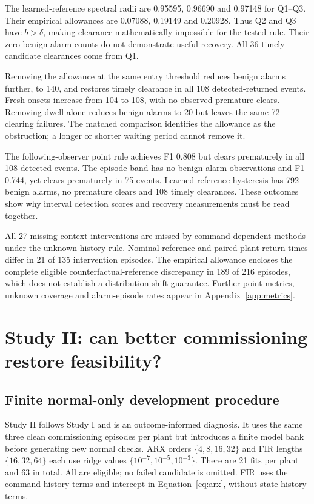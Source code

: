 \documentclass[11pt]{article}
\begin{document}
The learned-reference spectral radii are 0.95595, 0.96690 and 0.97148 for Q1--Q3. Their empirical allowances are 0.07088, 0.19149 and 0.20928. Thus Q2 and Q3 have $b>\delta$, making clearance mathematically impossible for the tested rule. Their zero benign alarm counts do not demonstrate useful recovery. All 36 timely candidate clearances come from Q1.

Removing the allowance at the same entry threshold reduces benign alarms further, to 140, and restores timely clearance in all 108 detected-returned events. Fresh onsets increase from 104 to 108, with no observed premature clears. Removing dwell alone reduces benign alarms to 20 but leaves the same 72 clearing failures. The matched comparison identifies the allowance as the obstruction; a longer or shorter waiting period cannot remove it.

The following-observer point rule achieves F1 0.808 but clears prematurely in all 108 detected events. The episode band has no benign alarm observations and F1 0.744, yet clears prematurely in 75 events. Learned-reference hysteresis has 792 benign alarms, no premature clears and 108 timely clearances. These outcomes show why interval detection scores and recovery measurements must be read together.

All 27 missing-context interventions are missed by command-dependent methods under the unknown-history rule. Nominal-reference and paired-plant return times differ in 21 of 135 intervention episodes. The empirical allowance encloses the complete eligible counterfactual-reference discrepancy in 189 of 216 episodes, which does not establish a distribution-shift guarantee. Further point metrics, unknown coverage and alarm-episode rates appear in Appendix~\ref{app:metrics}.

\section{Study II: can better commissioning restore feasibility?}
\subsection{Finite normal-only development procedure}
Study II follows Study I and is an outcome-informed diagnosis. It uses the same three clean commissioning episodes per plant but introduces a finite model bank before generating new normal checks. ARX orders $\{4,8,16,32\}$ and FIR lengths $\{16,32,64\}$ each use ridge values $\{10^{-7},10^{-5},10^{-3}\}$. There are 21 fits per plant and 63 in total. All are eligible; no failed candidate is omitted. FIR uses the command-history terms and intercept in Equation~\ref{eq:arx}, without state-history terms.
\end{document}
